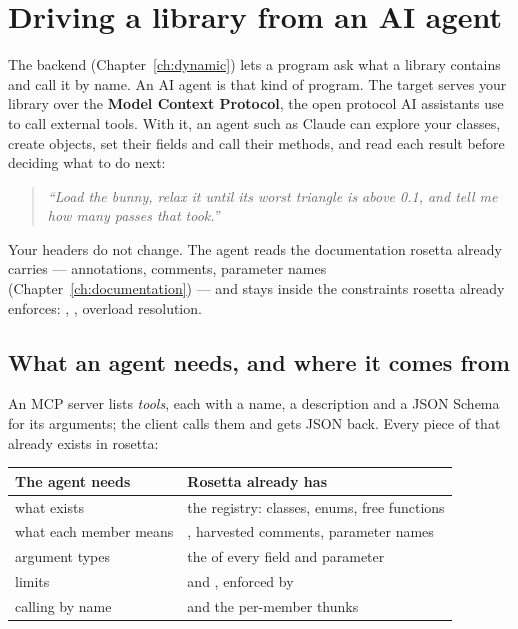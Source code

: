\chapter{Driving a library from an AI agent}
\label{ch:mcp}

The  backend (Chapter~\ref{ch:dynamic}) lets a program ask what
a library contains and call it by name. An AI agent is that kind of program.
The  target serves your library over the \textbf{Model Context
Protocol}, the open protocol AI assistants use to call external tools. With it,
an agent such as Claude can explore your classes, create objects, set their
fields and call their methods, and read each result before deciding what to do
next:

\begin{quote}
\itshape ``Load the bunny, relax it until its worst triangle is above 0.1, and
tell me how many passes that took.''
\end{quote}

Your headers do not change. The agent reads the documentation rosetta already
carries ---  annotations, \code{///} comments, parameter names
(Chapter~\ref{ch:documentation}) --- and stays inside the constraints rosetta
already enforces: , , overload resolution.

\section{What an agent needs, and where it comes from}

An MCP server lists \emph{tools}, each with a name, a description and a JSON
Schema for its arguments; the client calls them and gets JSON back. Every piece
of that already exists in rosetta:

\begin{center}
\small
\begin{tabular}{@{}L{4.6cm}L{8.6cm}@{}}
\toprule
\textbf{The agent needs} & \textbf{Rosetta already has} \\
\midrule
what exists & the registry: classes, enums, free functions \\
what each member means & , harvested comments, parameter names \\
argument types & the  of every field and parameter \\
limits &  and , enforced by  \\
calling by name &  and the per-member thunks \\
\bottomrule
\end{tabular}
\end{center}

